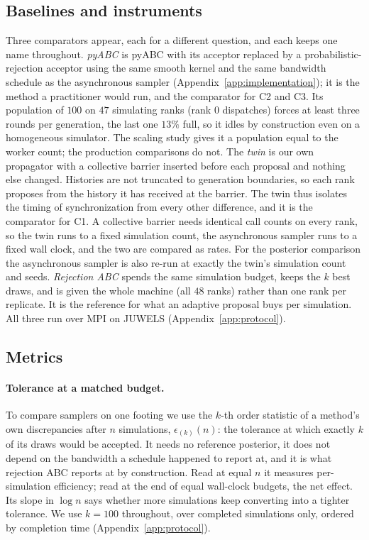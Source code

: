 \documentclass[pdflatex,sn-mathphys-num]{sn-jnl}
\theoremstyle{plain}
\theoremstyle{definition}
\begin{document}
\subsection{Baselines and instruments}\label{sec:experiments-baselines}\label{sec:implementation}
Three comparators appear, each for a different question, and each keeps one name throughout. \emph{pyABC} is pyABC \cite{klinger2018pyabc,schalte2022pyabc} with its acceptor replaced by a probabilistic-rejection acceptor using the same smooth kernel and the same bandwidth schedule as the asynchronous sampler (Appendix~\ref{app:implementation}); it is the method a practitioner would run, and the comparator for C2 and C3. Its population of $100$ on $47$ simulating ranks (rank $0$ dispatches) forces at least three rounds per generation, the last one $13\%$ full, so it idles by construction even on a homogeneous simulator. The scaling study gives it a population equal to the worker count; the production comparisons do not. The \emph{twin} is our own propagator with a collective barrier inserted before each proposal and nothing else changed. Histories are not truncated to generation boundaries, so each rank proposes from the history it has received at the barrier. The twin thus isolates the timing of synchronization from every other difference, and it is the comparator for C1. A collective barrier needs identical call counts on every rank, so the twin runs to a fixed simulation count, the asynchronous sampler runs to a fixed wall clock, and the two are compared as rates. For the posterior comparison the asynchronous sampler is also re-run at exactly the twin's simulation count and seeds. \emph{Rejection ABC} spends the same simulation budget, keeps the $k$ best draws, and is given the whole machine (all $48$ ranks) rather than one rank per replicate. It is the reference for what an adaptive proposal buys per simulation. All three run over MPI on JUWELS (Appendix~\ref{app:protocol}).

\subsection{Metrics}\label{sec:experiments-metrics}
\paragraph{Tolerance at a matched budget.} To compare samplers on one footing we use the $k$-th order statistic of a method's own discrepancies after $n$ simulations, $\epsilon_{(k)}(n)$: the tolerance at which exactly $k$ of its draws would be accepted. It needs no reference posterior, it does not depend on the bandwidth a schedule happened to report at, and it is what rejection ABC reports at by construction. Read at equal $n$ it measures per-simulation efficiency; read at the end of equal wall-clock budgets, the net effect. Its slope in $\log n$ says whether more simulations keep converting into a tighter tolerance. We use $k=100$ throughout, over completed simulations only, ordered by completion time (Appendix~\ref{app:protocol}).
\end{document}
